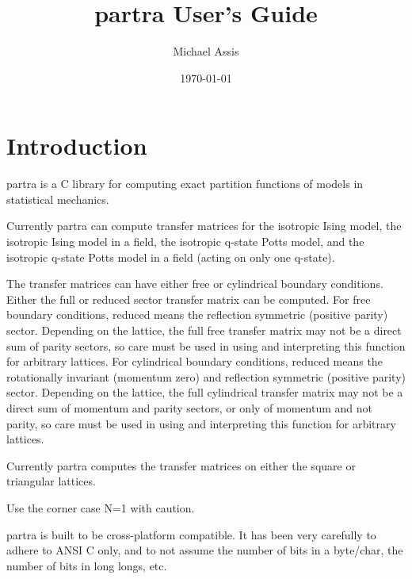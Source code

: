 \documentclass{article}
\begin{document}
\title{partra User's Guide}
\author{Michael Assis}
\date{\today}
\maketitle


\section{Introduction}
partra is a C library for computing exact partition functions of models in statistical mechanics. 

Currently partra can compute transfer matrices for the isotropic Ising model, the isotropic Ising model in a field, the isotropic q-state Potts model, and the isotropic q-state Potts model in a field (acting on only one q-state).

The transfer matrices can have either free or cylindrical boundary conditions. Either the full or reduced sector transfer matrix can be computed. For free boundary conditions, reduced means the reflection symmetric (positive parity) sector. Depending on the lattice, the full free transfer matrix may not be a direct sum of parity sectors, so care must be used in using and interpreting this function for arbitrary lattices. For cylindrical boundary conditions, reduced means the rotationally invariant (momentum zero) and reflection symmetric (positive parity) sector. Depending on the lattice, the full cylindrical transfer matrix may not be a direct sum of momentum and parity sectors, or only of momentum and not parity, so care must be used in using and interpreting this function for arbitrary lattices.

Currently partra computes the transfer matrices on either the square or triangular lattices. 

Use the corner case N=1 with caution.


partra is built to be cross-platform compatible. It has been very carefully to adhere to ANSI C only, and to not assume the number of bits in a byte/char, the number of bits in long longs, etc. 
\end{document}
